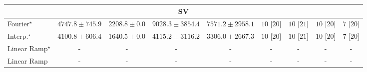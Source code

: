 \begin{tabular}{l|cccc|cccc|}
\cline{1-9}
\multicolumn{9}{c}{\rule{0pt}{8pt}SV} \\
\midrule
Fourier$^\star$ & {\cellcolor[HTML]{96B6D7}} \color[HTML]{000000} $4747.8\pm 745.9$ & {\cellcolor[HTML]{F4EDF6}} \color[HTML]{000000} $2208.8\pm 0.0$ & {\cellcolor[HTML]{023B5D}} \color[HTML]{F1F1F1} $9028.3\pm 3854.4$ & {\cellcolor[HTML]{0569A4}} \color[HTML]{F1F1F1} $7571.2\pm 2958.1$ & {\cellcolor[HTML]{49006A}} \color[HTML]{F1F1F1} $10$ [$20$] & {\cellcolor[HTML]{49006A}} \color[HTML]{F1F1F1} $10$ [$21$] & {\cellcolor[HTML]{49006A}} \color[HTML]{F1F1F1} $10$ [$20$] & {\cellcolor[HTML]{CD238F}} \color[HTML]{F1F1F1} $7$ [$20$] \\
Interp.$^\star$ & {\cellcolor[HTML]{B7C5DF}} \color[HTML]{000000} $4100.8\pm 606.4$ & {\cellcolor[HTML]{FFF7FB}} \color[HTML]{000000} $1640.5\pm 0.0$ & {\cellcolor[HTML]{B5C4DF}} \color[HTML]{000000} $4115.2\pm 3116.2$ & {\cellcolor[HTML]{D7D6E9}} \color[HTML]{000000} $3306.0\pm 2667.3$ & {\cellcolor[HTML]{49006A}} \color[HTML]{F1F1F1} $10$ [$20$] & {\cellcolor[HTML]{49006A}} \color[HTML]{F1F1F1} $10$ [$21$] & {\cellcolor[HTML]{49006A}} \color[HTML]{F1F1F1} $10$ [$20$] & {\cellcolor[HTML]{CD238F}} \color[HTML]{F1F1F1} $7$ [$20$] \\
Linear Ramp$^\star$ & {\cellcolor[HTML]{000000}} \color[HTML]{F1F1F1} {\cellcolor{white}} \color{black} - & {\cellcolor[HTML]{000000}} \color[HTML]{F1F1F1} {\cellcolor{white}} \color{black} - & {\cellcolor[HTML]{000000}} \color[HTML]{F1F1F1} {\cellcolor{white}} \color{black} - & {\cellcolor[HTML]{000000}} \color[HTML]{F1F1F1} {\cellcolor{white}} \color{black} - & {\cellcolor[HTML]{000000}} \color[HTML]{F1F1F1} {\cellcolor{white}} \color{black} - & {\cellcolor[HTML]{000000}} \color[HTML]{F1F1F1} {\cellcolor{white}} \color{black} - & {\cellcolor[HTML]{000000}} \color[HTML]{F1F1F1} {\cellcolor{white}} \color{black} - & {\cellcolor[HTML]{000000}} \color[HTML]{F1F1F1} {\cellcolor{white}} \color{black} - \\
Linear Ramp & {\cellcolor[HTML]{000000}} \color[HTML]{F1F1F1} {\cellcolor{white}} \color{black} - & {\cellcolor[HTML]{000000}} \color[HTML]{F1F1F1} {\cellcolor{white}} \color{black} - & {\cellcolor[HTML]{000000}} \color[HTML]{F1F1F1} {\cellcolor{white}} \color{black} - & {\cellcolor[HTML]{000000}} \color[HTML]{F1F1F1} {\cellcolor{white}} \color{black} - & {\cellcolor[HTML]{000000}} \color[HTML]{F1F1F1} {\cellcolor{white}} \color{black} - & {\cellcolor[HTML]{000000}} \color[HTML]{F1F1F1} {\cellcolor{white}} \color{black} - & {\cellcolor[HTML]{000000}} \color[HTML]{F1F1F1} {\cellcolor{white}} \color{black} - & {\cellcolor[HTML]{000000}} \color[HTML]{F1F1F1} {\cellcolor{white}} \color{black} - \\

\end{tabular}
